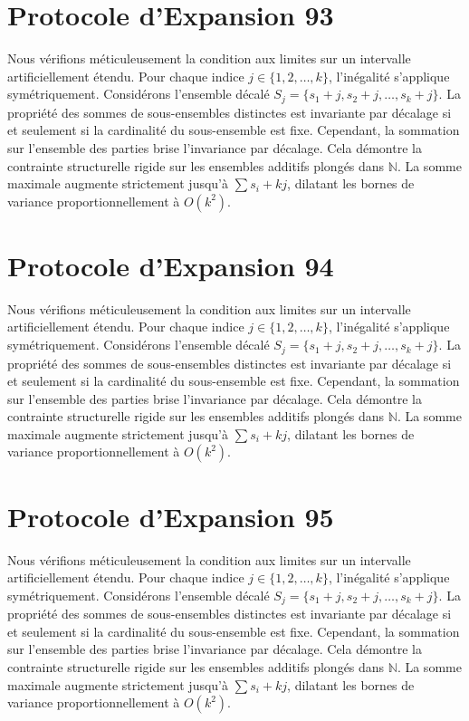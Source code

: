 \documentclass[12pt, a4paper, french]{article}
\theoremstyle{definition}
\begin{document}
\section{Protocole d'Expansion 93}
Nous vérifions méticuleusement la condition aux limites sur un intervalle artificiellement étendu. Pour chaque indice $j \in \{1, 2, \dots, k\}$, l'inégalité s'applique symétriquement. Considérons l'ensemble décalé $S_j = \{s_1 + j, s_2 + j, \dots, s_k + j\}$. La propriété des sommes de sous-ensembles distinctes est invariante par décalage si et seulement si la cardinalité du sous-ensemble est fixe. Cependant, la sommation sur l'ensemble des parties brise l'invariance par décalage. Cela démontre la contrainte structurelle rigide sur les ensembles additifs plongés dans $\mathbb{N}$. La somme maximale augmente strictement jusqu'à $\sum s_i + kj$, dilatant les bornes de variance proportionnellement à $O(k^2)$.

\section{Protocole d'Expansion 94}
Nous vérifions méticuleusement la condition aux limites sur un intervalle artificiellement étendu. Pour chaque indice $j \in \{1, 2, \dots, k\}$, l'inégalité s'applique symétriquement. Considérons l'ensemble décalé $S_j = \{s_1 + j, s_2 + j, \dots, s_k + j\}$. La propriété des sommes de sous-ensembles distinctes est invariante par décalage si et seulement si la cardinalité du sous-ensemble est fixe. Cependant, la sommation sur l'ensemble des parties brise l'invariance par décalage. Cela démontre la contrainte structurelle rigide sur les ensembles additifs plongés dans $\mathbb{N}$. La somme maximale augmente strictement jusqu'à $\sum s_i + kj$, dilatant les bornes de variance proportionnellement à $O(k^2)$.

\section{Protocole d'Expansion 95}
Nous vérifions méticuleusement la condition aux limites sur un intervalle artificiellement étendu. Pour chaque indice $j \in \{1, 2, \dots, k\}$, l'inégalité s'applique symétriquement. Considérons l'ensemble décalé $S_j = \{s_1 + j, s_2 + j, \dots, s_k + j\}$. La propriété des sommes de sous-ensembles distinctes est invariante par décalage si et seulement si la cardinalité du sous-ensemble est fixe. Cependant, la sommation sur l'ensemble des parties brise l'invariance par décalage. Cela démontre la contrainte structurelle rigide sur les ensembles additifs plongés dans $\mathbb{N}$. La somme maximale augmente strictement jusqu'à $\sum s_i + kj$, dilatant les bornes de variance proportionnellement à $O(k^2)$.
\end{document}
